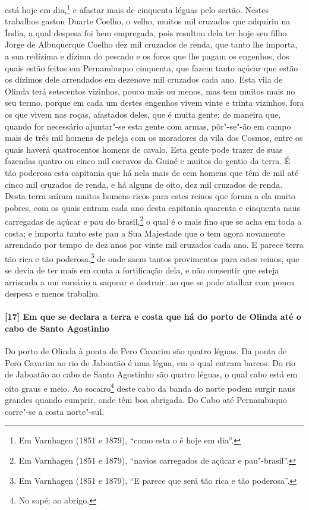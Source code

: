 \begin{linenumbers}
está hoje em dia,\footnote{ Em Varnhagen (1851 e 1879), ``como esta o é hoje em dia''.} e
afastar mais de cinquenta léguas pelo sertão. Nestes trabalhos gastou Duarte Coelho, o
velho, muitos mil cruzados que adquiriu na Índia, a qual despesa foi bem empregada, pois
resultou dela ter hoje seu filho Jorge de Albuquerque Coelho dez mil cruzados de renda,
que tanto lhe importa, a sua redízima e dízima do pescado e os foros que lhe pagam os
engenhos, dos quais estão feitos em Pernambuquo cinquenta, que fazem tanto açúcar que
estão os dízimos dele arrendados em dezenove mil cruzados cada ano. Esta vila de Olinda
terá setecentos vizinhos, pouco mais ou menos, mas tem muitos mais no seu termo, porque em
cada um destes engenhos vivem vinte e trinta vizinhos, fora os que vivem nas roças,
afastados deles, que é muita gente; de maneira que, quando for necessário ajuntar"-se esta
gente com armas, pôr"-se"-ão em campo mais de três mil homens de peleja com os moradores da
vila dos Cosmos, entre os quais haverá quatrocentos homens de cavalo. Esta gente pode
trazer de suas fazendas quatro ou cinco mil escravos da Guiné e muitos do gentio da terra.
É tão poderosa esta capitania que há nela mais de cem homens que têm de mil até cinco mil
cruzados de renda, e há alguns de oito, dez mil cruzados de renda. Desta terra saíram
muitos homens ricos para estes reinos que foram a ela muito pobres, com os quais entram
cada ano desta capitania quarenta e cinquenta naus carregadas de açúcar e pau do
brasil,\footnote{ Em Varnhagen (1851 e 1879), ``navios carregados de açúcar e
pau"-brasil''.} o qual é o mais fino que se acha em toda a costa; e importa tanto este pau
a Sua Majestade que o tem agora novamente arrendado por tempo de dez anos por vinte mil
cruzados cada ano. E parece terra tão rica e tão poderosa,\footnote{ Em Varnhagen (1851 e
1879), ``E parece que será tão rica e tão poderosa''.} de onde saem tantos provimentos
para estes reinos, que se devia de ter mais em conta a fortificação dela, e não consentir
que esteja arriscada a um corsário a saquear e destruir, ao que se pode atalhar com pouca
despesa e menos trabalho.

\paragraph{[17] Em que se declara a terra e costa que há do porto de Olinda até o cabo de
Santo Agostinho} \quad
Do porto de Olinda à ponta de Pero Cavarim são quatro léguas. Da ponta de Pero Cavarim ao
rio de Jaboatão é uma légua, em o qual entram barcos. Do rio de Jaboatão ao cabo de Santo
Agostinho são quatro léguas, o qual cabo está em oito graus e meio. Ao socairo\footnote{
No sopé; ao abrigo.} deste cabo da banda do norte podem surgir naus grandes quando
cumprir, onde têm boa abrigada. Do Cabo até Pernambuquo corre"-se a costa norte"-sul.


\end{linenumbers}

